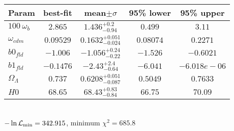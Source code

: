 \begin{tabular}{|l|c|c|c|c|} 
 \hline 
Param & best-fit & mean$\pm\sigma$ & 95\% lower & 95\% upper \\ \hline 
$100~\omega_{b }$ &$2.865$ & $1.436_{-0.94}^{+0.2}$ & $0.499$ & $3.11$ \\ 
$\omega_{cdm }$ &$0.09529$ & $0.1632_{-0.024}^{+0.051}$ & $0.08074$ & $0.2271$ \\ 
$b0_{fld }$ &$-1.006$ & $-1.056_{-0.22}^{+0.24}$ & $-1.526$ & $-0.6021$ \\ 
$b1_{fld }$ &$-0.1476$ & $-2.43_{-0.64}^{+2.4}$ & $-6.041$ & $-6.018e-06$ \\ 
$\Omega_{\Lambda }$ &$0.737$ & $0.6208_{-0.087}^{+0.051}$ & $0.5049$ & $0.7633$ \\ 
$H0$ &$68.65$ & $68.43_{-0.84}^{+0.83}$ & $66.75$ & $70.09$ \\ 
\hline 
 \end{tabular} \\ 
$-\ln{\cal L}_\mathrm{min} =342.915$, minimum $\chi^2=685.8$ \\ 
